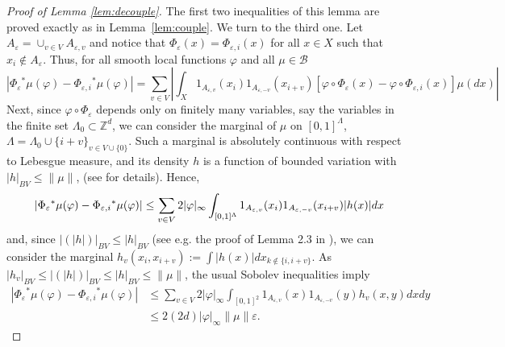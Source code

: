 \documentclass{amsart}
\numberwithin{equation}{section}
\begin{document}
\begin{proof}[Proof of Lemma \ref{lem:decouple}]
  The first two inequalities of this lemma are proved exactly as in
  Lemma~\ref{lem:couple}. We turn to the third one.  Let $A_{\varepsilon}=\cup_{v\in
    V}A_{{\varepsilon},v}$ and notice that $\Phi_{\varepsilon}(x)=\Phi_{{\varepsilon},i}(x)$ for all $x\in
  X$ such that $x_i\not\in A_{\varepsilon}$. Thus, for all smooth local functions ${\varphi}$
  and all $\mu\in{{\mathcal B}}$
  \[
  |\Phi_{\varepsilon}{^*}\mu({\varphi})-\Phi_{{\varepsilon},i}{^*}\mu({\varphi})|=\sum_{v\in
    V}\left|\int_X{1}_{A_{{\varepsilon},v}}(x_i){1}_{A_{{\varepsilon},-v}}(x_{i+v})\left[{\varphi}\circ
      \Phi_{\varepsilon}(x)-{\varphi}\circ \Phi_{{\varepsilon},i}(x)\right]\mu(dx)\right|
  \]
  Next, since ${\varphi}\circ \Phi_{\varepsilon}$ depends only on finitely many variables, say the variables
  in the finite set $\Lambda_0\subset {{\mathbb Z}}^d$, we can consider the
  marginal of $\mu$ on $[0,1]^\Lambda$, $\Lambda=\Lambda_0\cup\{i+v\}_{v\in V\cup\{0\}}$. Such a marginal is absolutely
  continuous with respect to Lebesgue measure, and its density $h$ is a
  function of bounded variation with $|h|_{BV}\leq \|\mu\|$, (see
  \cite{kl-lecture} for details). Hence,
  \[
  |\Phi_{\varepsilon}{^*}\mu({\varphi})-\Phi_{{\varepsilon},i}{^*}\mu({\varphi})|\leq \sum_{v\in V}2|{\varphi}|_\infty\int_{[0,1]^\Lambda} {1}_{A_{{\varepsilon},v}}(x_i){1}_{A_{{\varepsilon},-v}}(x_{i+v})|h(x)|dx\\
  \]
  and, since $|(|h|)|_{BV}\leq |h|_{BV}$ (see e.g. the proof of Lemma 2.3 in
  \cite{BGK-07}), we can consider the marginal $h_v(x_i,x_{i+v}):=\int
  |h(x)|dx_{k\not\in\{i,i+v\}}$. As $|h_v|_{BV}\leq |(|h|)|_{BV}\leq |h|_{BV}\leq\|\mu\|$, the usual
  Sobolev inequalities imply
  \[
  \begin{split}
    |\Phi_{\varepsilon}{^*}\mu({\varphi})-\Phi_{{\varepsilon},i}{^*}\mu({\varphi})|
    &\leq 
    \sum_{v\in V}2|{\varphi}|_\infty\int_{[0,1]^2} {1}_{A_{{\varepsilon},v}}(x){1}_{A_{{\varepsilon},-v}}(y)h_v(x,y)dxdy\\
    &\leq 2(2d)|{\varphi}|_\infty\|\mu\|{\varepsilon}.
  \end{split}
  \]
\end{proof}
\end{document}
